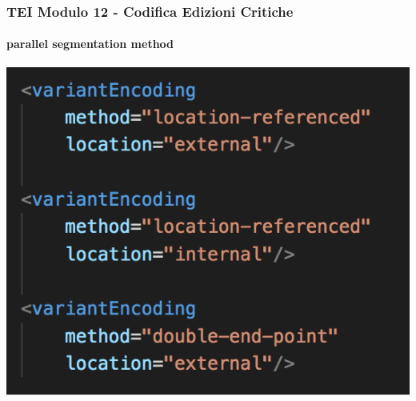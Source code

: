 \begin{frame}
    \frametitle{TEI Modulo 12 - Codifica Edizioni Critiche}
    \framesubtitle{parallel segmentation method}
    \addtocounter{nframe}{1}
    

    \begin{center}
       \includegraphics[width=.95\textwidth]{imgs/variantEncoding.png}
    \end{center}

\end{frame}












